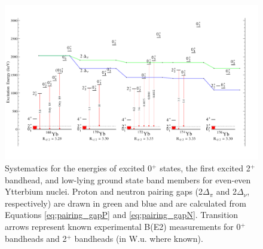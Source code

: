 \begin{landscape}
\begin{figure}[ht] 
\begin{center}
\includegraphics[height=0.8\textheight]{figures/SciDraw_YbSystematics.pdf}
\caption{Systematics for the energies of excited 0$^+$ states, the first excited 2$^+$ bandhead, and low-lying ground state band members for even-even Ytterbium nuclei. Proton and neutron pairing gaps (2$\Delta_\pi$ and 2$\Delta_\nu$, respectively) are drawn in green and blue and are calculated from Equations \ref{eq:pairing_gapP} and \ref{eq:pairing_gapN}. Transition arrows represent known experimental B(E2) measurements for 0$^+$ bandheads and 2$^+$ bandheads (in W.u. where known). \label{fig:YbSystematics}}
\end{center}
\end{figure}
\end{landscape}


